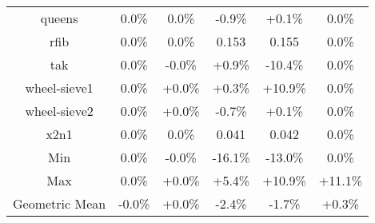 \begin{tabular}{ c c c c c c }
queens &  0.0\% &  0.0\% & -0.9\% & +0.1\% &  0.0\%\\
rfib &  0.0\% &  0.0\% & 0.153 & 0.155 &  0.0\%\\
tak &  0.0\% & -0.0\% & +0.9\% & -10.4\% &  0.0\%\\
wheel-sieve1 &  0.0\% & +0.0\% & +0.3\% & +10.9\% &  0.0\%\\
wheel-sieve2 &  0.0\% & +0.0\% & -0.7\% & +0.1\% &  0.0\%\\
x2n1 &  0.0\% &  0.0\% & 0.041 & 0.042 &  0.0\%\\
\hline
Min &  0.0\% & -0.0\% & -16.1\% & -13.0\% &  0.0\%\\
Max &  0.0\% & +0.0\% & +5.4\% & +10.9\% & +11.1\%\\
Geometric Mean & -0.0\% & +0.0\% & -2.4\% & -1.7\% & +0.3\%\\


\end{tabular}
